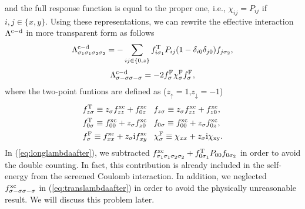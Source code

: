 %
and the full response function is equal to the proper one, i.e., $\chi_{ij} = P_{ij}$ if 
$i, j \in \{x,y\}$.
Using these representations, we can rewrite the effective interaction $\Lambda^{\rm c - \rm d}$ in
more transparent form as follows
%
\begin{equation}
	\Lambda^{\rm c - \rm d}_{\sigma_1\sigma_1\sigma_2\sigma_2} = -
	\sum_{ij \in \{0,z\}} f^{\rm T}_{i\sigma_1}P_{ij}(1-\delta_{i0}\delta_{j0})f_{j\sigma_2},
	\label{eq:longlambdaafter}
\end{equation}
%
\begin{equation}
	\Lambda^{\rm c - \rm d}_{\sigma-\sigma\sigma-\sigma} = -
	2f^{\rm F}_{\sigma}\chi^{\rm F}_{\sigma}f^{\rm F}_{\sigma},
	\label{eq:translambdaafter}
\end{equation}
%
where the two-point funtions are defined as ($z_{\uparrow} = 1$,$z_{\downarrow} = -1$)
%
\begin{equation}
	\begin{split}
	&f^{\rm T}_{z\sigma} \equiv z_{\sigma}f^{\rm xc}_{zz} + f^{\rm xc}_{0z} \;\;\;
	f_{z\sigma} \equiv z_{\sigma}f^{\rm xc}_{zz} + f^{\rm xc}_{z0},\\
	&f^{\rm T}_{0\sigma} \equiv f^{\rm xc}_{00} + z_{\sigma}f^{\rm xc}_{z0} \;\;\;
	f_{0\sigma} \equiv f^{\rm xc}_{00} + z_{\sigma}f^{\rm xc}_{0z}, \\
	&f^{\rm F}_{\sigma} \equiv f^{\rm xc}_{xx} + z_{\sigma}{\rm i}f^{\rm xc}_{xy} \;\;\;
	\chi^{\rm F}_{\sigma} \equiv \chi_{xx} + z_{\sigma}\rm i \chi_{xy}.
	\label{eq:fdefine}
\end{split}
\end{equation}
%
In (\ref{eq:longlambdaafter}), we subtracted $f^{\rm xc}_{\sigma_1\sigma_1\sigma_2\sigma_2}+
f^{\rm T}_{0\sigma_1}P_{00}f_{0\sigma_2}$ in order to avoid the double counting.
In fact, this contribution is already included in the self-energy from the screened Coulomb interaction.
In addition, we neglected $f^{\rm xc}_{\sigma-\sigma\sigma-\sigma}$ in (\ref{eq:translambdaafter})
in order to avoid the physically unreasonable result. We will discuss this problem later.

